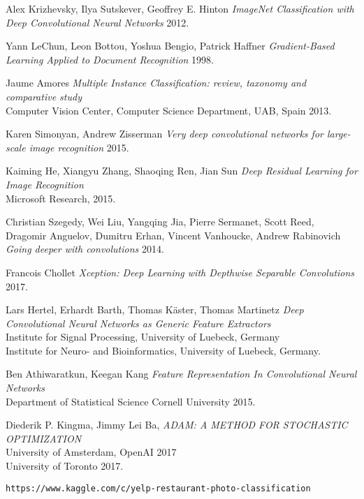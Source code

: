 \begin{thebibliography}{1}

 Alex Krizhevsky, Ilya Sutskever, Geoffrey E. Hinton {\em ImageNet Classification with Deep Convolutional Neural Networks}  2012.

 Yann LeChun, Leon Bottou, Yoshua Bengio, Patrick Haffner {\em Gradient-Based Learning Applied to Document Recognition} 1998.

 Jaume Amores {\em Multiple Instance Classification: review, taxonomy and
comparative study} \\
Computer Vision Center, Computer Science Department, UAB, Spain 2013.

 Karen Simonyan, Andrew Zisserman {\em Very deep convolutional networks for large-scale image recognition} 2015.

  Kaiming He, Xiangyu Zhang,  Shaoqing Ren, Jian Sun {\em Deep Residual Learning for Image Recognition} \\
Microsoft Research, 2015.

 Christian Szegedy, Wei Liu, Yangqing Jia, Pierre Sermanet, Scott Reed, Dragomir Anguelov, Dumitru Erhan, Vincent Vanhoucke, Andrew Rabinovich {\em Going deeper with convolutions} 2014.

 Francois Chollet {\em Xception: Deep Learning with Depthwise Separable Convolutions} 2017.

 Lars Hertel, Erhardt Barth, Thomas Käster, Thomas Martinetz {\em Deep Convolutional Neural Networks as Generic Feature Extractors} \\
Institute for Signal Processing, University of Luebeck, Germany \\
Institute for Neuro- and Bioinformatics, University of Luebeck, Germany.

 Ben Athiwaratkun, Keegan Kang {\em Feature Representation In Convolutional Neural
Networks} \\
Department of Statistical Science Cornell University 2015.

 Diederik P. Kingma, Jimmy Lei Ba, {\em ADAM: A METHOD FOR STOCHASTIC OPTIMIZATION} \\
University of Amsterdam, OpenAI 2017\\
University of Toronto 2017.

 \texttt{https://www.kaggle.com/c/yelp-restaurant-photo-classification}

\end{thebibliography}